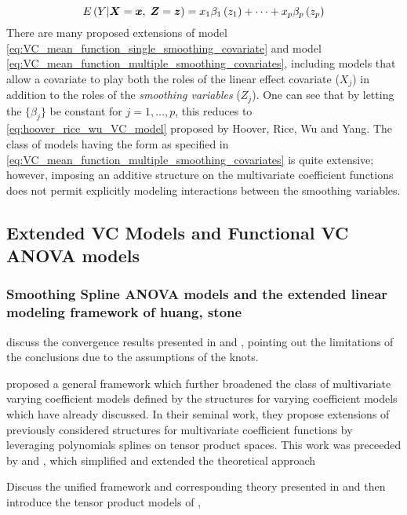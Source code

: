 \documentclass[12pt]{article}
\newcommand*\outlineskeleton{\color{green}}
\newcommand{\bfx}{\mbox{\boldmath $x$}}
\newcommand{\bfX}{\mbox{\boldmath $X$}}
\newcommand{\bfz}{\mbox{\boldmath $z$}}
\newcommand{\bfZ}{\mbox{\boldmath $Z$}}
\begin{document}
\begin{equation} \label{eq:VC_mean_function_multiple_smoothing_covariates}
E\left(Y \vert \bfX=\bfx,\;\bfZ = \bfz \right) = x_1\beta_1\left(z_1\right) + \dots  + x_p\beta_p\left(z_p\right)
\end{equation}
\noindent
There are many proposed extensions of  model \ref{eq:VC_mean_function_single_smoothing_covariate} and model \ref{eq:VC_mean_function_multiple_smoothing_covariates}, including models that allow a covariate to play both the roles of the linear effect covariate ($X_j$) in addition to the roles of the \textit{smoothing variables} ($Z_j$). One can see that by letting the $\lbrace  \beta_j \rbrace$ be constant for $j=1, \dots, p$, this reduces to \ref{eq:hoover_rice_wu_VC_model} proposed by Hoover, Rice, Wu and Yang. The class of models having the form as specified in \ref{eq:VC_mean_function_multiple_smoothing_covariates} is quite extensive; however, imposing an additive structure on the multivariate coefficient functions does not permit explicitly modeling  interactions between the smoothing variables. 

\subsection{{\outlineskeleton Extended VC Models and Functional VC ANOVA models}} \label{extended_VC_models}
\subsubsection{{\outlineskeleton Smoothing Spline ANOVA models and the extended linear modeling framework of huang, stone}}

{\outlineskeleton discuss the convergence results presented in \cite{huang1998functional} and \cite{huang1998projection}, pointing out the limitations of the conclusions due to the assumptions of the knots. }

\cite{huang2003extended} proposed a general framework which further broadened the class of multivariate varying coefficient models defined by the structures for varying coefficient models which have already discussed. In their seminal work, they propose extensions of previously considered structures for multivariate coefficient functions by leveraging polynomials splines on tensor product spaces. This work was preceeded by \cite{huang1998projection} and \cite{huang1998projection}, which simplified and extended the theoretical approach 

{\outlineskeleton Discuss the unified framework and corresponding theory presented in \cite{huang2001concave} and then introduce the tensor product models of \cite{eilers2003multivariate}, \cite{marx2005multidimensional}}
\end{document}
